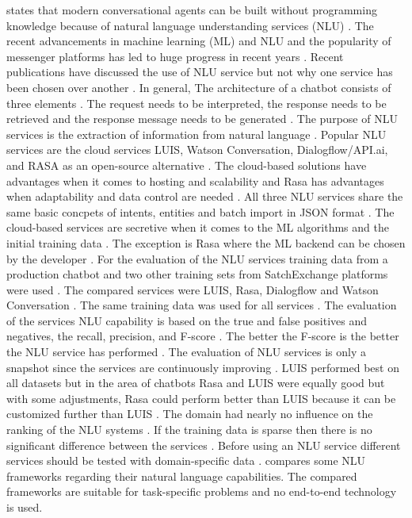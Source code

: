 \citet{braunEvaluatingNLU} states that modern conversational agents can be built without programming 
knowledge because of natural language understanding services (NLU) \cite{braunEvaluatingNLU}. 
The recent advancements in machine learning (ML) and NLU and the popularity of messenger platforms 
has led to huge progress in recent years \cite{braunEvaluatingNLU}. Recent publications have discussed 
the use of NLU service but not why one service has been chosen over another \cite{braunEvaluatingNLU}.
In general, The architecture of a chatbot consists of three elements \cite{braunEvaluatingNLU}. 
The request needs to be interpreted, the response needs to be retrieved and the response message
needs to be generated \cite{braunEvaluatingNLU}. 
The purpose of NLU services is the extraction of information from natural language \cite{braunEvaluatingNLU}. 
Popular NLU services are the cloud services LUIS, Watson Conversation, Dialogflow/API.ai, and RASA as an open-source alternative \cite{braunEvaluatingNLU}. 
The cloud-based solutions have advantages when it comes to hosting and scalability and Rasa has advantages
when adaptability and data control are needed \cite{braunEvaluatingNLU}. 
All three NLU services share the same basic concpets of intents, entities and batch import in JSON format \cite{braunEvaluatingNLU}.
The cloud-based services are secretive when it comes to the ML algorithms and the initial training data \cite{braunEvaluatingNLU}. 
The exception is Rasa where the ML backend can be chosen by the developer \cite{braunEvaluatingNLU}. 
For the evaluation of the NLU services training data from a production chatbot and two other training sets from SatchExchange
platforms were used \cite{braunEvaluatingNLU}. 
The compared services were LUIS, Rasa, Dialogflow and Watson Conversation \cite{braunEvaluatingNLU}. 
The same training data was used for all services \cite{braunEvaluatingNLU}. 
The evaluation of the services NLU capability is based on the true and false positives and negatives, 
the recall, precision, and F-score \cite{braunEvaluatingNLU}. 
The better the F-score is the better the NLU service has performed \cite{braunEvaluatingNLU}. 
The evaluation of NLU services is only a snapshot since the services are continuously improving \cite{braunEvaluatingNLU}. 
LUIS performed best on all datasets but in the area of chatbots Rasa and LUIS were equally good but 
with some adjustments, Rasa could perform better than LUIS because it can be customized further than LUIS \cite{braunEvaluatingNLU}. 
The domain had nearly no influence on the ranking of the NLU systems \cite{braunEvaluatingNLU}.
If the training data is sparse then there is no significant difference between the services \cite{braunEvaluatingNLU}. 
Before using an NLU service different services should be tested with domain-specific data \cite{braunEvaluatingNLU}.
\citet{braunEvaluatingNLU} compares some NLU frameworks regarding their natural language capabilities.
The compared frameworks are suitable for task-specific problems and no end-to-end technology is used.


